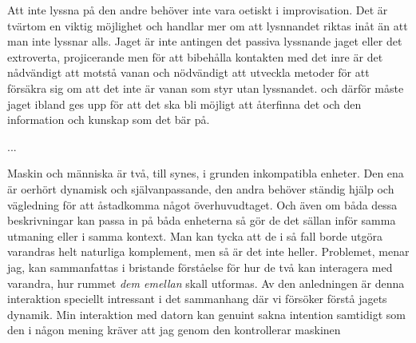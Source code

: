 \documentclass[a4paper]{article}
\begin{document}
Att inte lyssna på den andre behöver inte vara oetiskt i improvisation. Det är tvärtom en viktig möjlighet och handlar mer om att lysnnandet riktas inåt än att man inte lyssnar alls. Jaget är inte antingen det passiva lyssnande jaget eller det extroverta, projicerande men för att bibehålla kontakten med det inre är det nådvändigt att motstå vanan och nödvändigt att utveckla metoder för att försäkra sig om att det inte är vanan som styr utan lyssnandet. och därför måste jaget ibland ges upp för att det ska bli möjligt att återfinna det och den information och kunskap som det bär på.


\vspace{0.5cm}
...
\vspace{0.5cm}

Maskin och människa är två, till synes, i grunden inkompatibla enheter. Den ena är oerhört dynamisk och självanpassande, den andra behöver ständig hjälp och vägledning för att åstadkomma något överhuvudtaget. Och även om båda dessa beskrivningar kan passa in på båda enheterna så gör de det sällan inför samma utmaning eller i samma kontext. Man kan tycka att de i så fall borde utgöra varandras helt naturliga komplement, men så är det inte heller. Problemet, menar jag, kan sammanfattas i bristande förståelse för hur de två kan interagera med varandra, hur rummet \emph{dem emellan} skall utformas. Av den anledningen är denna interaktion speciellt intressant i det sammanhang där vi försöker förstå jagets dynamik. Min interaktion med datorn kan genuint sakna intention samtidigt som den i någon mening kräver att jag genom den kontrollerar maskinen

\end{document}
